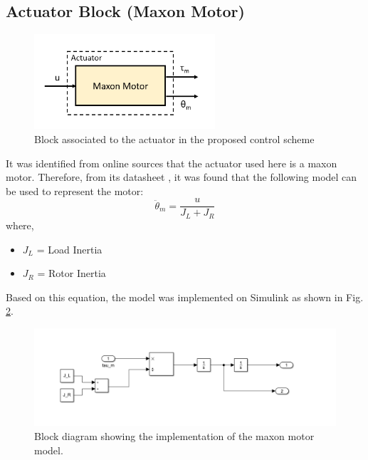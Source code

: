 \documentclass[a4paper,12pt]{report}
\begin{document}
\subsection{Actuator Block (Maxon Motor)}
\begin{figure}
	\centering
	\vspace{-20pt}
	\includegraphics[width=0.6\textwidth]{images/actuator-block-outside.png}
	\caption{Block associated to the actuator in the proposed control scheme}
	\label{maxon-motor}
	\vspace{-30pt}
\end{figure}
It was identified from online sources that the actuator used here is a maxon motor. Therefore, from its datasheet \cite{maxon-key-information}, it was found that the following model can be used to represent the motor:
\begin{equation}
\ddot{\theta}_{m}=\dfrac{u}{J_L+J_R}
\end{equation}
where,
\begin{itemize}
	\renewcommand\labelitemi{--}
	\item $ J_L $ = Load Inertia
	\item $ J_R $ = Rotor Inertia
\end{itemize}

Based on this equation, the model was implemented on Simulink as shown in Fig. \ref{maxon-motor-BD}. 

\begin{figure}[H]
	\centering
	\includegraphics[width=\textwidth]{images/maxon-motor-model.png}
	\caption{Block diagram showing the implementation of the maxon motor model.}
	\label{maxon-motor-BD}

\end{figure}
\end{document}
